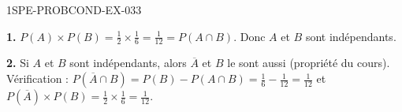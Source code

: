 \begin{corrige}{1SPE-PROBCOND-EX-033}

\textbf{1.} $P(A) \times P(B) = \frac{1}{2} \times \frac{1}{6} = \frac{1}{12} = P(A \cap B)$. Donc $A$ et $B$ sont indépendants.

\textbf{2.} Si $A$ et $B$ sont indépendants, alors $\overline{A}$ et $B$ le sont aussi (propriété du cours). Vérification : $P(\overline{A} \cap B) = P(B) - P(A \cap B) = \frac{1}{6}-\frac{1}{12} = \frac{1}{12}$ et $P(\overline{A}) \times P(B) = \frac{1}{2} \times \frac{1}{6} = \frac{1}{12}$. \checkmark

\end{corrige}

